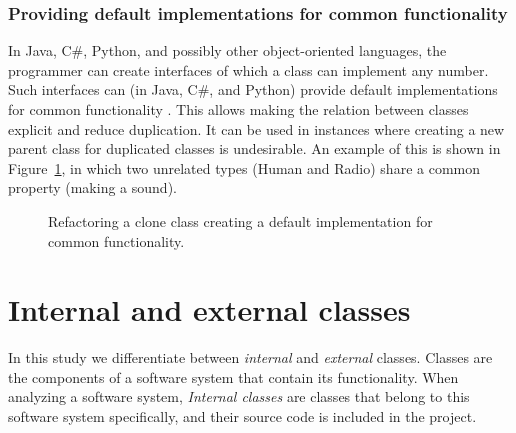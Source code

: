\subsubsection{Providing default implementations for common functionality}
In Java, C\#, Python, and possibly other object-oriented languages, the programmer can create interfaces of which a class can implement any number. Such interfaces can (in Java, C\#, and Python) provide default implementations for common functionality \cite{mohnen2002interfaces}. This allows making the relation between classes explicit and reduce duplication. It can be used in instances where creating a new parent class for duplicated classes is undesirable. An example of this is shown in Figure~\ref{fig:createinterfaceabstraction}, in which two unrelated types (Human and Radio) share a common property (making a sound).

\begin{figure}[H]
\begin{parcolumns}{2}
\end{parcolumns}
\caption{Refactoring a clone class creating a default implementation for common functionality.}
\label{fig:createinterfaceabstraction}
\end{figure}

\section{Internal and external classes}
In this study we differentiate between \textit{internal} and \textit{external} classes. Classes are the components of a software system that contain its functionality. When analyzing a software system, \textit{Internal classes} are classes that belong to this software system specifically, and their source code is included in the project.

